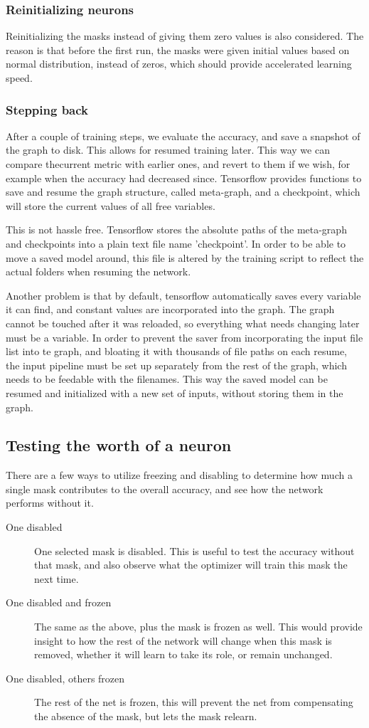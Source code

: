 \documentclass[12pt]{report}
\begin{document}
\subsubsection{Reinitializing neurons}
Reinitializing the masks instead of giving them zero values is also considered. The reason is that before the first run, the masks were given initial values based on normal distribution, instead of zeros, which should provide accelerated learning speed.
\subsubsection{Stepping back}
After a couple of training steps, we evaluate the accuracy, and save a snapshot of the graph to disk. This allows for resumed training later. This way we can compare thecurrent metric with earlier ones, and revert to them if we wish, for example when the accuracy had decreased since. Tensorflow provides functions to save and resume the graph structure, called meta-graph, and a checkpoint, which will store the current values of all free variables.

This is not hassle free. Tensorflow stores the absolute paths of the meta-graph and checkpoints into a plain text file name 'checkpoint'. In order to be able to move a saved model around, this file is altered by the training script to reflect the actual folders when resuming the network.

Another problem is that by default, tensorflow automatically saves every variable it can find, and constant values are incorporated into the graph. The graph cannot be touched after it was reloaded, so everything what needs changing later must be a variable. In order to prevent the saver from incorporating the input file list into te graph, and bloating it with thousands of file paths on each resume, the input pipeline must be set up separately from the rest of the graph, which needs to be feedable with the filenames. This way the saved model can be resumed and initialized with a new set of inputs, without storing them in the graph.
\subsection{Testing the worth of a neuron}
There are a few ways to utilize freezing and disabling to determine how much a single mask contributes to the overall accuracy, and see how the network performs without it.
\begin{description}
	\item[One disabled] One selected mask is disabled. This is useful to test the accuracy without that mask, and also observe what the optimizer will train this mask the next time.
	\item[One disabled and frozen] The same as the above, plus the mask is frozen as well. This would provide insight to how the rest of the network will change when this mask is removed, whether it will learn to take its role, or remain unchanged.
	\item[One disabled, others frozen] The rest of the net is frozen, this will prevent the net from compensating the absence of the mask, but lets the mask relearn.
\end{description}
\end{document}
